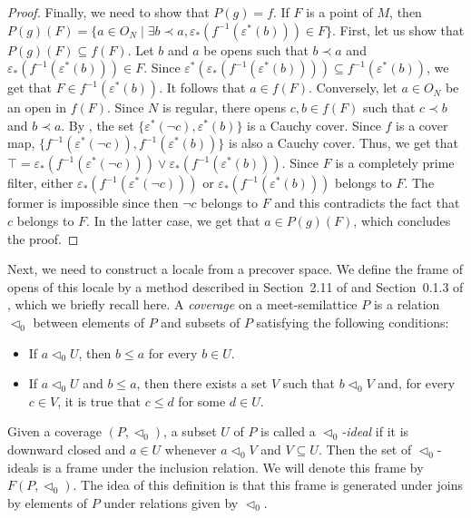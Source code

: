 \documentclass[reqno]{amsart}
\theoremstyle{definition}
\theoremstyle{remark}
\numberwithin{figure}{section}
\newcommand{\rb}{\prec}
\begin{document}
\begin{proof}
Finally, we need to show that $P(g) = f$.
If $F$ is a point of $M$, then $P(g)(F) = \{ a \in O_N \mid \exists b \rb a, \varepsilon_*(f^{-1}(\varepsilon^*(b))) \in F \}$.
First, let us show that $P(g)(F) \subseteq f(F)$.
Let $b$ and $a$ be opens such that $b \rb a$ and $\varepsilon_*(f^{-1}(\varepsilon^*(b))) \in F$.
Since $\varepsilon^*(\varepsilon_*(f^{-1}(\varepsilon^*(b)))) \subseteq f^{-1}(\varepsilon^*(b))$, we get that $F \in f^{-1}(\varepsilon^*(b))$.
It follows that $a \in f(F)$.
Conversely, let $a \in O_N$ be an open in $f(F)$.
Since $N$ is regular, there opens $c,b \in f(F)$ such that $c \rb b$ and $b \rb a$.
By , the set $\{ \varepsilon^*(\neg c), \varepsilon^*(b) \}$ is a Cauchy cover.
Since $f$ is a cover map, $\{ f^{-1}(\varepsilon^*(\neg c)), f^{-1}(\varepsilon^*(b)) \}$ is also a Cauchy cover.
Thus, we get that $\top = \varepsilon_*(f^{-1}(\varepsilon^*(\neg c))) \vee \varepsilon_*(f^{-1}(\varepsilon^*(b)))$.
Since $F$ is a completely prime filter, either $\varepsilon_*(f^{-1}(\varepsilon^*(\neg c)))$ or $\varepsilon_*(f^{-1}(\varepsilon^*(b)))$ belongs to $F$.
The former is impossible since then $\neg c$ belongs to $F$ and this contradicts the fact that $c$ belongs to $F$.
In the latter case, we get that $a \in P(g)(F)$, which concludes the proof.
\end{proof}

Next, we need to construct a locale from a precover space.
We define the frame of opens of this locale by a method described in Section~2.11 of \cite{stone-spaces} and Section~0.1.3 of \cite{vickers-compact}, which we briefly recall here.
A \emph{coverage} on a meet-semilattice $P$ is a relation $\triangleleft_0$ between elements of $P$ and subsets of $P$ satisfying the following conditions:
\begin{itemize}
\item If $a \triangleleft_0 U$, then $b \leq a$ for every $b \in U$.
\item If $a \triangleleft_0 U$ and $b \leq a$, then there exists a set $V$ such that $b \triangleleft_0 V$ and, for every $c \in V$, it is true that $c \leq d$ for some $d \in U$.
\end{itemize}
Given a coverage $(P,\triangleleft_0)$, a subset $U$ of $P$ is called a \emph{$\triangleleft_0$-ideal} if it is downward closed and $a \in U$ whenever $a \triangleleft_0 V$ and $V \subseteq U$.
Then the set of $\triangleleft_0$-ideals is a frame under the inclusion relation.
We will denote this frame by $F(P,\triangleleft_0)$.
The idea of this definition is that this frame is generated under joins by elements of $P$ under relations given by $\triangleleft_0$.
\end{document}
